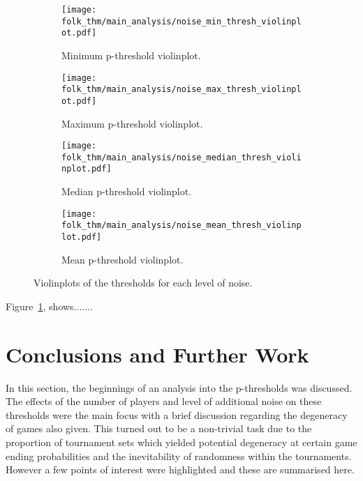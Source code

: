 \begin{figure}
    \begin{subfigure}{0.45\textwidth}
        \centering
        \texttt{[image: folk\_thm/main\_analysis/noise\_min\_thresh\_violinplot.pdf]}
        \caption{Minimum p-threshold violinplot.}\label{subfig:min_thresh_noise_violinplot}
    \end{subfigure}
    \begin{subfigure}{0.45\textwidth}
        \centering
        \texttt{[image: folk\_thm/main\_analysis/noise\_max\_thresh\_violinplot.pdf]}
        \caption{Maximum p-threshold violinplot.}\label{subfig:max_thresh_noise_violinplot}
    \end{subfigure}

    \begin{subfigure}{0.45\textwidth}
        \centering
        \texttt{[image: folk\_thm/main\_analysis/noise\_median\_thresh\_violinplot.pdf]}
        \caption{Median p-threshold violinplot.}\label{subfig:median_thresh_noise_violinplot}
    \end{subfigure}
    \begin{subfigure}{0.45\textwidth}
        \centering
        \texttt{[image: folk\_thm/main\_analysis/noise\_mean\_thresh\_violinplot.pdf]}
        \caption{Mean p-threshold violinplot.}\label{subfig:mean_thresh_noise_violinplot}
    \end{subfigure}
    \caption{Violinplots of the thresholds for each level of noise.}\label{fig:noise_p_thresh_violinplot}
\end{figure}

Figure~\ref{subfig:min_thresh_noise_violinplot}, shows.......


\section{Conclusions and Further Work}\label{sec:Conclusions_and_Further_Work}
In this section, the beginnings of an analysis into the p-thresholds was
discussed. The effects of the number of players and level of additional noise on
these thresholds were the main focus with a brief discussion regarding the
degeneracy of games also given. This turned out to be a non-trivial task due to
the proportion of tournament sets which yielded potential degeneracy at certain
game ending probabilities and the inevitability of randomness within the
tournaments. However a few points of interest were highlighted and these are
summarised here. 

